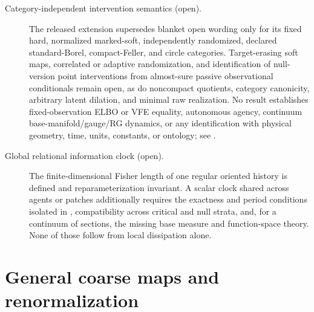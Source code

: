 \begin{description}
\item[Category-independent intervention semantics (open).]
The released extension supersedes blanket open wording only for its fixed
hard, normalized marked-soft, independently randomized, declared
standard-Borel, compact-Feller, and circle categories.  Target-erasing soft
maps, correlated or adaptive randomization, and identification of null-version
point interventions from almost-sure passive observational conditionals remain
open, as do noncompact quotients, category canonicity, arbitrary latent
dilation, and minimal raw realization.  No result establishes fixed-observation
ELBO or VFE equality, autonomous agency, continuum base-manifold/gauge/RG
dynamics, or any identification with physical geometry, time, units,
constants, or ontology; see
. 

\item[Global relational information clock (open).]
The finite-dimensional Fisher length of one regular oriented history is
defined and reparameterization invariant.  A scalar clock shared across
agents or patches additionally requires the exactness and period conditions
isolated in , compatibility across
critical and null strata, and, for a continuum of sections, the missing base
measure and function-space theory.  None of those follow from local
dissipation alone. 
\end{description}

\section{General coarse maps and renormalization}

